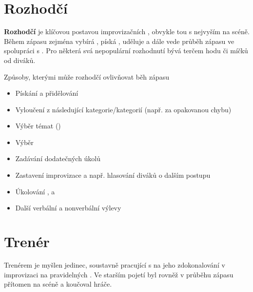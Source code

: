  
 
\needspace{5cm} \section{Rozhodčí} \label{rozhodčí} \textbf{Rozhodčí}{} je klíčovou postavou improvizačních , obvykle tou s nejvyším  na scéně. 
Během zápasu zejména vybírá , píská , uděluje   a  
dále vede průběh zápasu ve spolupráci s . 
Pro některá svá nepopulární rozhodnutí bývá terčem hodu  či míčků od diváků. 
 
 
Způsoby, kterými může rozhodčí ovlivňovat běh zápasu 
\begin{itemize}
\item Pískání  a přidělování 
\item Vyloučení z následující kategorie/kategorií (např. za opakovanou chybu)
\item Výběr témat ()
\item Výběr 
\item Zadávání dodatečných úkolů 
\item Zastavení improvizace a např. hlasování diváků o dalším postupu
\item Úkolování ,  a 
\item Další verbální a nonverbální výlevy
\end{itemize}
 
 
\needspace{5cm} \section{Trenér} \label{trenér} Trenérem je myšlen jedinec, soustavně pracující s  na jeho zdokonalování v improvizaci na pravidelných 
. 
Ve starším pojetí  byl rovněž v průběhu zápasu přítomen na scéně a koučoval hráče. 
  
